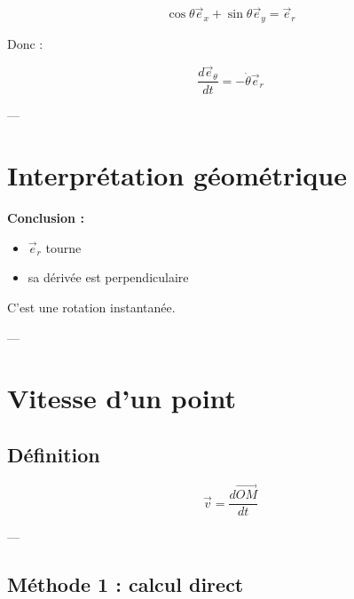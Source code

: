 \documentclass[11pt,a4paper]{article}
\begin{document}
\[
\cos\theta \vec{e}_x + \sin\theta \vec{e}_y = \vec{e}_r
\]

Donc :

\[
\boxed{
\frac{d\vec{e}_\theta}{dt} = -\dot{\theta} \vec{e}_r
}
\]

---

\section{Interprétation géométrique}

\begin{center}
\end{center}

\bigskip

\textbf{Conclusion :}

\begin{itemize}
\item $\vec{e}_r$ tourne
\item sa dérivée est perpendiculaire
\end{itemize}

\bigskip

 C’est une rotation instantanée.

---

\section{Vitesse d’un point}

\subsection{Définition}

\[
\vec{v} = \frac{d\vec{OM}}{dt}
\]

---

\subsection{Méthode 1 : calcul direct}
\end{document}
